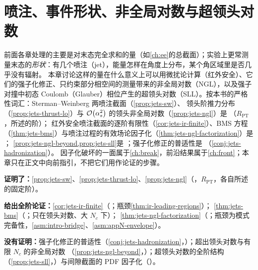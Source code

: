 \chapter{喷注、事件形状、非全局对数与超领头对数}\label{ch:jets}

前面各章处理的主要是对末态完全求和的量（如\cref{ch:ee}的总截面）；实验上更常测量末态的\emph{形状}：有几个喷注（jet），能量怎样在角度上分布，某个角区域里是否几乎没有辐射。
本章讨论这样的量在什么意义上可以用微扰论计算（红外安全）、它们的强子化修正、只约束部分相空间的测量带来的非全局对数（NGL），以及强子对撞中初态 Coulomb（Glauber）相位产生的超领头对数（SLL）。按本书的严格性词汇：Sterman--Weinberg 两喷注截面（\cref{prop:jets-sw}）、
领头阶推力分布（\cref{prop:jets-thrust-lo}）与 $\mathcal{O}\!\left(\alpha_s^2\right)$ 的领头非全局对数（\cref{prop:jets-ngl}）是 \tagR（$R_{\mathrm{PT}}$，所述的阶）；
红外安全喷注截面的逐阶有限性（\cref{cor:jets-ir-finite}）、BMS 方程（\cref{thm:jets-bms}）与喷注过程的有效场论因子化（\cref{thm:jets-ngl-factorization}）是 \tagA；
\cref{prop:jets-ngl-beyond,prop:jets-sll}是 \tagP；强子化修正的普适性是 \tagC（\cref{conj:jets-hadronization}）。
因子化破坏的一面属于\cref{ch:break}，前沿结果属于\cref{ch:front}；本章只在正文中向前指引，不把它们用作论证的步骤。

\begin{tcolorbox}[enhanced,breakable,title=本章证明了什么／没有证明什么,fonttitle=\bfseries,
  colback=gray!3!white,colframe=gray!55!black,boxrule=0.6pt,arc=2pt,
  left=5pt,right=5pt,top=3pt,bottom=3pt,before skip=6pt,after skip=6pt]
\textbf{证明了：}\cref{prop:jets-sw}、\cref{prop:jets-thrust-lo}、\cref{prop:jets-ngl}（\tagR，$R_{\mathrm{PT}}$，各自所述的固定阶）。\par
\textbf{给出全阶论证：}\cref{cor:jets-ir-finite}（\tagA；瓶颈\cref{thm:ir-leading-regions}）；
\cref{thm:jets-bms}（\tagA；只在领头对数、大 $N_c$ 下）；
\cref{thm:jets-ngl-factorization}（\tagA；瓶颈为模式完备性，\cref{asm:intro-bridge}、\cref{asm:appN-envelope}）。\par
\textbf{没有证明：}强子化修正的普适性（\cref{conj:jets-hadronization}，\tagC）；超出领头对数与有限 $N_c$ 的非全局对数
（\cref{prop:jets-ngl-beyond}，\tagP）；超领头对数的全阶结构（\cref{prop:jets-sll}，\tagP）与间隙截面的 PDF 因子化（\tagC）。
\end{tcolorbox}

